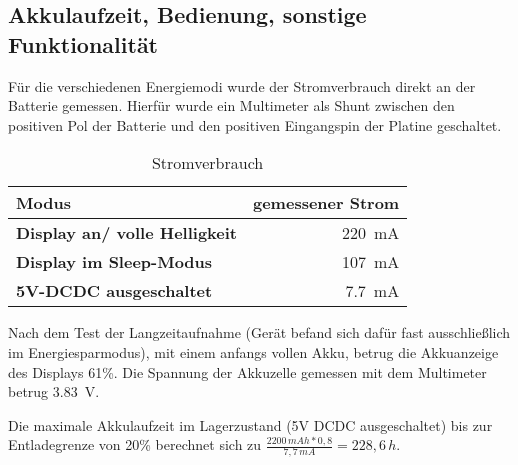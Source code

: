 \subsection{Akkulaufzeit, Bedienung, sonstige Funktionalität}

Für die verschiedenen Energiemodi wurde der Stromverbrauch direkt an der Batterie gemessen. Hierfür wurde ein Multimeter als Shunt zwischen den positiven Pol der Batterie und den positiven Eingangspin der Platine geschaltet.\\

\begin{table}
\center
\begin{tabular}[]{l|r}
\textbf{Modus} & \textbf{gemessener Strom} 
\\
\hline
\textbf{Display an/ volle Helligkeit} & \SI{220}{\milli\ampere} 
\\
\hline
\textbf{Display im Sleep-Modus} & \SI{107}{\milli\ampere} 
\\
\hline
\textbf{5V-DCDC ausgeschaltet} & \SI{7,7}{\milli\ampere}
\end{tabular}

\caption{Stromverbrauch}
\label{tab:Stromverbrauch}

\end{table}

Nach dem Test der Langzeitaufnahme (Gerät befand sich dafür fast ausschließlich im Energiesparmodus), mit einem anfangs vollen Akku, betrug die Akkuanzeige des Displays 61\%. Die Spannung der Akkuzelle gemessen mit dem Multimeter betrug \SI{3,83}{\volt}.

Die maximale Akkulaufzeit im Lagerzustand (5V DCDC ausgeschaltet) bis zur Entladegrenze von 20\% berechnet sich zu
$ \frac{2200\,mAh*0,8}{7,7\,mA} = 228,6\,h $.
